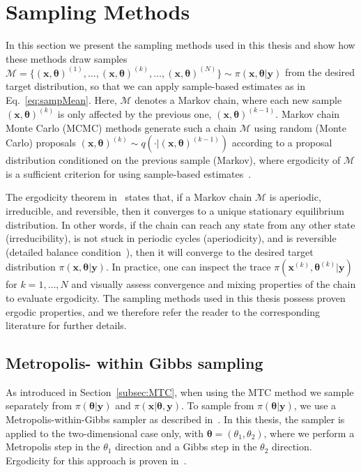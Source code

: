 \section{Sampling Methods}
\label{sec:sampling}
In this section we present the sampling methods used in this thesis and show how these methods draw samples $ \mathcal{M} = \{ (\bm{x}, \bm{\theta} )^{(1)}, \dots, (\bm{x}, \bm{\theta} )^{(k)}, \dots, (\bm{x}, \bm{\theta})^{(N)} \} \sim \pi(\bm{x}, \bm{\theta} |  \bm{y})$ from the desired target distribution, so that we can apply sample-based estimates as in Eq.~\ref{eq:sampMean}.
Here, $\mathcal{M}$ denotes a Markov chain, where each new sample $(\bm{x}, \bm{\theta})^{(k)}$ is only affected by the previous one, $(\bm{x}, \bm{\theta})^{(k-1)}$.
Markov chain Monte Carlo (MCMC) methods generate such a chain $\mathcal{M}$ using random (Monte Carlo) proposals $(\bm{x}, \bm{\theta})^{(k)} \sim q( \cdot |  (\bm{x}, \bm{\theta})^{(k-1)})$ according to a proposal distribution conditioned on the previous sample (Markov), where ergodicity of $\mathcal{M}$ is a sufficient criterion for using sample-based estimates~\cite{tan2016LecNot, roberts2004general}.

The ergodicity theorem in~\cite{tan2016LecNot} states that, if a Markov chain $\mathcal{M}$ is aperiodic, irreducible, and reversible, then it converges to a unique stationary equilibrium distribution.
In other words, if the chain can reach any state from any other state (irreducibility), is not stuck in periodic cycles (aperiodicity), and is reversible (detailed balance condition~\cite{tan2016LecNot}), then it will converge to the desired target distribution $\pi(\bm{x}, \bm{\theta} |  \bm{y})$.
In practice, one can inspect the trace $\pi(\bm{x}^{(k)}, \bm{\theta}^{(k)} |  \bm{y})$ for $k = 1, \dots, N$ and visually assess convergence and mixing properties of the chain to evaluate ergodicity.
The sampling methods used in this thesis possess proven ergodic properties, and we therefore refer the reader to the corresponding literature for further details.


\subsection{Metropolis- within Gibbs sampling}
As introduced in Section~\ref{subsec:MTC}, when using the MTC method we sample separately from $\pi(\bm{\theta} |  \bm{y})$ and $\pi(\bm{x} |  \bm{\theta}, \bm{y})$. To sample from $\pi(\bm{\theta} |  \bm{y})$, we use a Metropolis-within-Gibbs sampler as described in~\cite{fox2016fast}.
In this thesis, the sampler is applied to the two-dimensional case only, with $\bm{\theta} = (\theta_1, \theta_2)$, where we perform a Metropolis step in the $\theta_1$ direction and a Gibbs step in the $\theta_2$ direction.
Ergodicity for this approach is proven in~\cite{roberts2006harris}.

